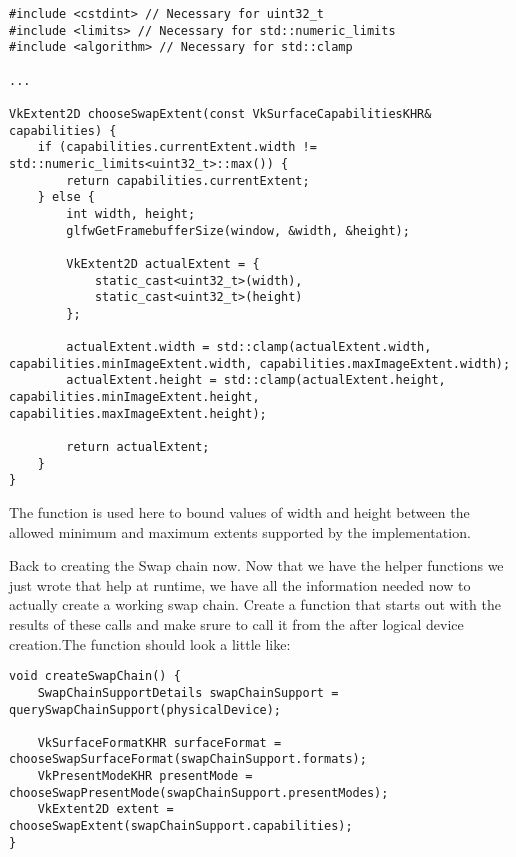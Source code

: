 \begin{center}
\begin{minipage}{0.95\linewidth}
\begin{lstlisting}
#include <cstdint> // Necessary for uint32_t
#include <limits> // Necessary for std::numeric_limits
#include <algorithm> // Necessary for std::clamp

...

VkExtent2D chooseSwapExtent(const VkSurfaceCapabilitiesKHR& capabilities) {
    if (capabilities.currentExtent.width != std::numeric_limits<uint32_t>::max()) {
        return capabilities.currentExtent;
    } else {
        int width, height;
        glfwGetFramebufferSize(window, &width, &height);

        VkExtent2D actualExtent = {
            static_cast<uint32_t>(width),
            static_cast<uint32_t>(height)
        };

        actualExtent.width = std::clamp(actualExtent.width, capabilities.minImageExtent.width, capabilities.maxImageExtent.width);
        actualExtent.height = std::clamp(actualExtent.height, capabilities.minImageExtent.height, capabilities.maxImageExtent.height);

        return actualExtent;
    }
}
\end{lstlisting}
\end{minipage}
\end{center}

\par The  function is used here to bound values of width and height between the allowed minimum and maximum extents supported by the implementation.

\par Back to creating the Swap chain now. Now that we have the helper functions we just wrote that help at runtime, we have all the information needed now to actually create a working swap chain. Create a  function that starts out with the results of these calls and make srure to call it from the  after logical device creation.The function should look a little like:

\begin{center}
\begin{minipage}{0.95\linewidth}
\begin{lstlisting}
void createSwapChain() {
    SwapChainSupportDetails swapChainSupport = querySwapChainSupport(physicalDevice);

    VkSurfaceFormatKHR surfaceFormat = chooseSwapSurfaceFormat(swapChainSupport.formats);
    VkPresentModeKHR presentMode = chooseSwapPresentMode(swapChainSupport.presentModes);
    VkExtent2D extent = chooseSwapExtent(swapChainSupport.capabilities);
}
\end{lstlisting}
\end{minipage}
\end{center}


